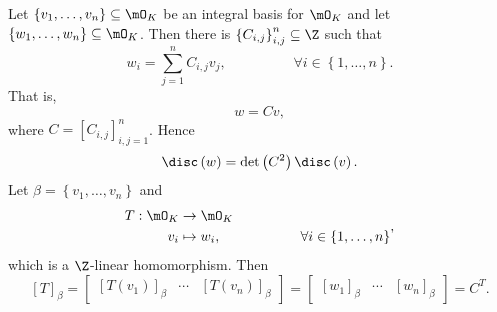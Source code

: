 \documentclass[pmath441]{subfiles}
\begin{document}
    \np Let $\left\lbrace v_1,\ldots,v_n \right\rbrace\subseteq\mO_K$ be an integral basis for $\mO_K$ and let $\left\lbrace w_1,\ldots,w_n \right\rbrace\subseteq\mO_K$. Then there is $\left\lbrace C_{i,j} \right\rbrace^n_{i,j}\subseteq\Z$ such that
    \begin{equation*}
        w_i = \sum^{n}_{j=1}C_{i,j}v_j, \hspace{2cm}\forall i\in\left\lbrace 1,\ldots,n \right\rbrace.
    \end{equation*}
    That is,
    \begin{equation*}
        w = Cv,
    \end{equation*}
    where $C = \left[ C_{i,j} \right]^n_{i,j=1}$. Hence
    \begin{equation*}
        \disc\left( w \right) = \det\left( C^{2} \right)\disc\left( v \right).
    \end{equation*}
    Let $\beta = \left\lbrace v_1,\ldots,v_n \right\rbrace$ and
    \begin{equation*}
        \begin{aligned}
            T:\mO_K&\to\mO_K \\
            v_i&\mapsto w_i, \hspace{2cm}\forall i\in\left\lbrace 1,\ldots,n \right\rbrace
        \end{aligned} ,
    \end{equation*}
    which is a $\Z$-linear homomorphism. Then
    \begin{equation*}
        \left[ T \right]_{\beta} = \begin{bmatrix} \left[ T\left( v_1 \right) \right]_{\beta} & \cdots & \left[ T\left( v_n \right) \right]_{\beta} \end{bmatrix} = \begin{bmatrix} \left[ w_1 \right]_{\beta} & \cdots & \left[ w_n \right]_{\beta} \end{bmatrix} = C^{T}.
    \end{equation*}
    
    
    
    
    
    
    
    
    
    
    
    
    
    
    
    
    
    
    
    
    
    
    
    
    
    
    
    
    
    
    
    
    
    
    
    
    
    
\end{document}
